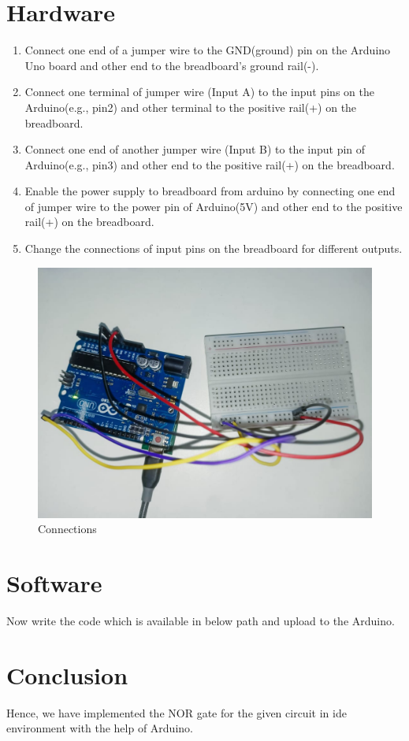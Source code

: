 \documentclass[10pt,a4paper]{article}
\begin{document}
	\section{Hardware}
	\begin{enumerate}
		\item Connect one end of a jumper wire to the GND(ground) pin on the Arduino Uno board and other end to the breadboard's ground rail(-).
		\item Connect one terminal of jumper wire (Input A) to the input pins on the Arduino(e.g., pin2) and other terminal to the positive rail(+) on the breadboard.
		\item Connect one end of another jumper wire (Input B) to the input pin of Arduino(e.g., pin3) and other end to the positive rail(+) on the breadboard.
		\item Enable the power supply to breadboard from arduino by connecting one end of jumper wire to the power pin of Arduino(5V) and other end to the positive rail(+) on the breadboard.
		\item Change the connections of input pins on the breadboard for different outputs.
	\end{enumerate}
	\begin{figure}[H]
		\centering
		\includegraphics[width=0.3\columnwidth]{21-1.jpg}
		\caption{Connections}
		\label{fig:connections}
	\end{figure}
	\section{Software}
	Now write the code which is available in below path and upload to the Arduino. \\
	\section{Conclusion}
	Hence, we have implemented the NOR gate for the given circuit in ide environment with the help of Arduino.
\end{document}
